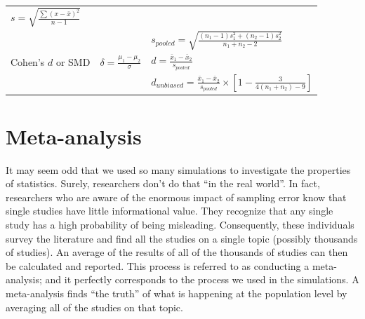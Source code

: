 \documentclass[
]{krantz}
\begin{document}
\begin{longtable}[]{@{}lll@{}}
\begin{minipage}[t]{0.30\columnwidth}
\(s =\sqrt{\frac{\sum{(x - \bar{x})^2}}{n-1}}\)\strut
\end{minipage}\tabularnewline
\begin{minipage}[t]{0.30\columnwidth}\raggedright
\strut
\end{minipage} & \begin{minipage}[t]{0.30\columnwidth}\raggedright
\strut
\end{minipage} & \begin{minipage}[t]{0.30\columnwidth}\raggedright
\(s_{pooled} = \sqrt{\frac{(n_1 -1)s_1^2 + (n_2 -1)s_2^2}{n_1 + n_2-2}}\)\strut
\end{minipage}\tabularnewline
\begin{minipage}[t]{0.30\columnwidth}\raggedright
Cohen's \(d\) or SMD\strut
\end{minipage} & \begin{minipage}[t]{0.30\columnwidth}\raggedright
\(\delta= \frac{\mu_{1} - \mu_{2}}{\sigma}\)\strut
\end{minipage} & \begin{minipage}[t]{0.30\columnwidth}\raggedright
\(d = \frac{\bar{x}_{1} - \bar{x}_{2}}{s_{pooled}}\)\strut
\end{minipage}\tabularnewline
\begin{minipage}[t]{0.30\columnwidth}\raggedright
\strut
\end{minipage} & \begin{minipage}[t]{0.30\columnwidth}\raggedright
\strut
\end{minipage} & \begin{minipage}[t]{0.30\columnwidth}\raggedright
\(d_{unbiased} = \frac{\bar{x}_{1} - \bar{x}_{2}}{s_{pooled}} \times [1 - \frac{3}{4(n_1 + n_2)-9}]\)\strut
\end{minipage}\tabularnewline
\bottomrule
\end{longtable}

\singlespacing

\hypertarget{meta-analysis}{%
\section{Meta-analysis}\label{meta-analysis}}

It may seem odd that we used so many simulations to investigate the properties of statistics. Surely, researchers don't do that ``in the real world''. In fact, researchers who are aware of the enormous impact of sampling error know that single studies have little informational value. They recognize that any single study has a high probability of being misleading. Consequently, these individuals survey the literature and find all the studies on a single topic (possibly thousands of studies). An average of the results of all of the thousands of studies can then be calculated and reported. This process is referred to as conducting a meta-analysis; and it perfectly corresponds to the process we used in the simulations. A meta-analysis finds ``the truth'' of what is happening at the population level by averaging all of the studies on that topic.
\end{document}
